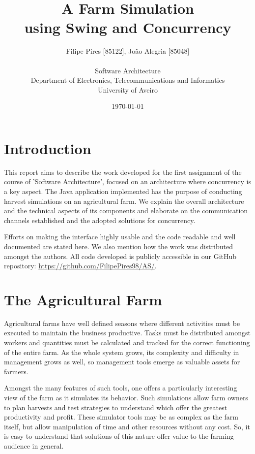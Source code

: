 \documentclass[12pt]{article}
\title{A Farm Simulation\\using Swing and Concurrency}
\author
{Filipe Pires [85122], João Alegria [85048]\\
\\
Software Architecture\\
\normalsize{Department of Electronics, Telecommunications and Informatics}\\
\normalsize{University of Aveiro}\\
}
\date{\today{}}
\begin{document}
 

\baselineskip18pt

\maketitle 

\section{Introduction} %

This report aims to describe the work developed for the first assignment of the course of 'Software Architecture', focused on an architecture where concurrency 
is a key aspect.
The Java application implemented has the purpose of conducting harvest simulations on an agricultural farm.
We explain the overall architecture and the technical aspects of its components and elaborate on the communication channels established and the adopted 
solutions for concurrency.

Efforts on making the interface highly usable and the code readable and well documented are stated here.
We also mention how the work was distributed amongst the authors.
All code developed is publicly accessible in our GitHub repository:
\url{https://github.com/FilipePires98/AS/}.
\newpage

\section{The Agricultural Farm} \label{farm} %

Agricultural farms have well defined seasons where different activities must be executed to maintain the business productive.
Tasks must be distributed amongst workers and quantities must be calculated and tracked for the correct functioning of the entire farm.
As the whole system grows, its complexity and difficulty in management grows as well, so management tools emerge as valuable assets for farmers.

Amongst the many features of such tools, one offers a particularly interesting view of the farm as it simulates its behavior.
Such simulations allow farm owners to plan harvests and test strategies to understand which offer the greatest productivity and profit.
These simulator tools may be as complex as the farm itself, but allow manipulation of time and other resources without any cost.
So, it is easy to understand that solutions of this nature offer value to the farming audience in general.
\end{document}
